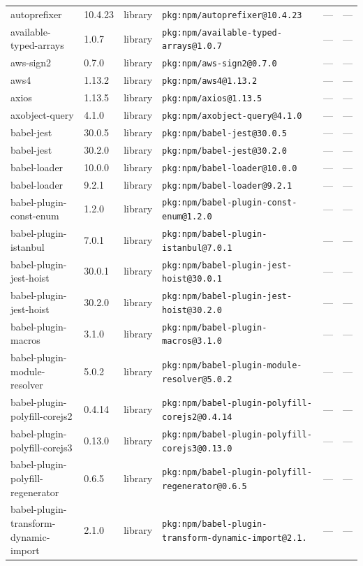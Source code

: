 \documentclass[11pt]{article}
\begin{document}
\begin{longtable}{|l|l|l|p{2.2cm}|l|p{4cm}|}
autoprefixer & 10.4.23 & library & \texttt{pkg:npm/autoprefixer@10.4.23} & — & — \\
available-typed-arrays & 1.0.7 & library & \texttt{pkg:npm/available-typed-arrays@1.0.7} & — & — \\
aws-sign2 & 0.7.0 & library & \texttt{pkg:npm/aws-sign2@0.7.0} & — & — \\
aws4 & 1.13.2 & library & \texttt{pkg:npm/aws4@1.13.2} & — & — \\
axios & 1.13.5 & library & \texttt{pkg:npm/axios@1.13.5} & — & — \\
axobject-query & 4.1.0 & library & \texttt{pkg:npm/axobject-query@4.1.0} & — & — \\
babel-jest & 30.0.5 & library & \texttt{pkg:npm/babel-jest@30.0.5} & — & — \\
babel-jest & 30.2.0 & library & \texttt{pkg:npm/babel-jest@30.2.0} & — & — \\
babel-loader & 10.0.0 & library & \texttt{pkg:npm/babel-loader@10.0.0} & — & — \\
babel-loader & 9.2.1 & library & \texttt{pkg:npm/babel-loader@9.2.1} & — & — \\
babel-plugin-const-enum & 1.2.0 & library & \texttt{pkg:npm/babel-plugin-const-enum@1.2.0} & — & — \\
babel-plugin-istanbul & 7.0.1 & library & \texttt{pkg:npm/babel-plugin-istanbul@7.0.1} & — & — \\
babel-plugin-jest-hoist & 30.0.1 & library & \texttt{pkg:npm/babel-plugin-jest-hoist@30.0.1} & — & — \\
babel-plugin-jest-hoist & 30.2.0 & library & \texttt{pkg:npm/babel-plugin-jest-hoist@30.2.0} & — & — \\
babel-plugin-macros & 3.1.0 & library & \texttt{pkg:npm/babel-plugin-macros@3.1.0} & — & — \\
babel-plugin-module-resolver & 5.0.2 & library & \texttt{pkg:npm/babel-plugin-module-resolver@5.0.2} & — & — \\
babel-plugin-polyfill-corejs2 & 0.4.14 & library & \texttt{pkg:npm/babel-plugin-polyfill-corejs2@0.4.14} & — & — \\
babel-plugin-polyfill-corejs3 & 0.13.0 & library & \texttt{pkg:npm/babel-plugin-polyfill-corejs3@0.13.0} & — & — \\
babel-plugin-polyfill-regenerator & 0.6.5 & library & \texttt{pkg:npm/babel-plugin-polyfill-regenerator@0.6.5} & — & — \\
babel-plugin-transform-dynamic-import & 2.1.0 & library & \texttt{pkg:npm/babel-plugin-transform-dynamic-import@2.1.} & — & — \\

\end{longtable}
\end{document}

